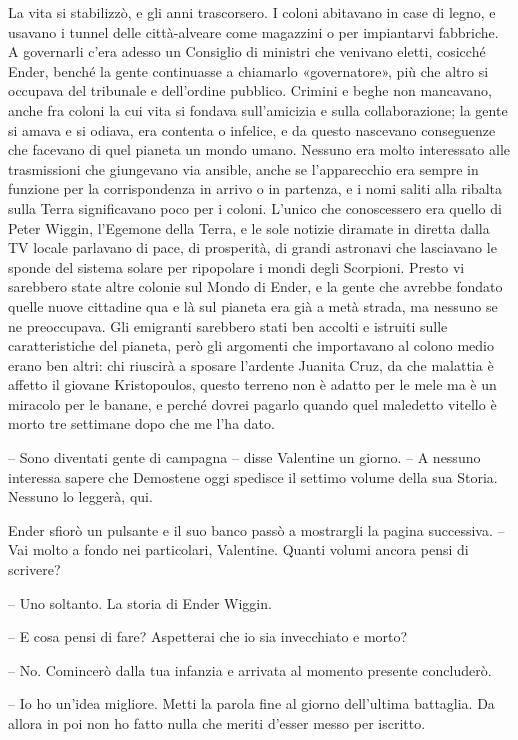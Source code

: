 {La vita si stabilizzò, e gli anni trascorsero. I coloni abitavano in
	case di legno, e usavano i tunnel delle città-alveare come magazzini o
	per impiantarvi fabbriche. A governarli c'era adesso un Consiglio di
	ministri che venivano eletti, cosicché Ender, benché la gente
	continuasse a chiamarlo «governatore», più che altro si occupava del
	tribunale e dell'ordine pubblico. Crimini e beghe non mancavano, anche
	fra coloni la cui vita si fondava sull'amicizia e sulla collaborazione;
	la gente si amava e si odiava, era contenta o infelice, e da questo
	nascevano conseguenze che facevano di quel pianeta un mondo umano.
	Nessuno era molto interessato alle trasmissioni che giungevano via
	ansible, anche se l'apparecchio era sempre in funzione per la
	corrispondenza in arrivo o in partenza, e i nomi saliti alla ribalta
	sulla Terra significavano poco per i coloni. L'unico che conoscessero
	era quello di Peter Wiggin, l'Egemone della Terra, e le sole notizie
	diramate in diretta dalla TV locale parlavano di pace, di prosperità, di
	grandi astronavi che lasciavano le sponde del sistema solare per
	ripopolare i mondi degli Scorpioni. Presto vi sarebbero state altre
	colonie sul Mondo di Ender, e la gente che avrebbe fondato quelle nuove
	cittadine qua e là sul pianeta era già a metà strada, ma nessuno se ne
	preoccupava. Gli emigranti sarebbero stati ben accolti e istruiti sulle
	caratteristiche del pianeta, però gli argomenti che importavano al
	colono medio erano ben altri: chi riuscirà a sposare l'ardente Juanita
	Cruz, da che malattia è affetto il giovane Kristopoulos, questo terreno
	non è adatto per le mele ma è un miracolo per le banane, e perché dovrei
	pagarlo quando quel maledetto vitello è morto tre settimane dopo che me
	l'ha dato.}

{-- Sono diventati gente di campagna -- disse Valentine un giorno. -- A
	nessuno interessa sapere che Demostene oggi spedisce il settimo volume
	della sua Storia. Nessuno lo leggerà, qui.}

{Ender sfiorò un pulsante e il suo banco passò a mostrargli la pagina
	successiva. -- Vai molto a fondo nei particolari, Valentine. Quanti
	volumi ancora pensi di scrivere?}

{-- Uno soltanto. La storia di Ender Wiggin.}

{-- E cosa pensi di fare? Aspetterai che io sia invecchiato e morto?}

{-- No. Comincerò dalla tua infanzia e arrivata al momento presente
	concluderò.}

{-- Io ho un'idea migliore. Metti la parola fine al giorno dell'ultima
	battaglia. Da allora in poi non ho fatto nulla che meriti d'esser messo
	per iscritto.}


